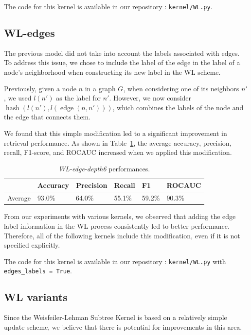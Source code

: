 \documentclass{IEEEtran}
\begin{document}
The code for this kernel is available in our repository : \texttt{kernel/WL.py}.

\subsection{WL-edges}
The previous model did not take into account the labels associated with edges. To address this issue, we chose to include the label of the edge in the label of a node's neighborhood when constructing its new label in the WL scheme.

Previously, given a node $n$ in a graph $G$, when considering one of its neighbors $n'$, we used $l(n')$ as the label for $n'$. However, we now consider $\operatorname*{hash}(l(n'), l(\operatorname{edge}(n, n')))$, which combines the labels of the node and the edge that connects them.

We found that this simple modification led to a significant improvement in retrieval performance.
As shown in Table~\ref{tab:wldepth6edge}, the average accuracy, precision, recall, F1-score, and ROCAUC increased when we applied this modification.


\begin{table}[h]
    \centering
    \begin{tabular}{l|llll|l}
                & Accuracy & Precision & Recall & F1     & ROCAUC \\
        \hline
        Average & 93.0\%   & 64.0\%    & 55.1\% & 59.2\% & 90.3\% \\
    \end{tabular}
    \caption{\emph{WL-edge-depth6} performances.}
    \label{tab:wldepth6edge}
\end{table}

From our experiments with various kernels, we observed that adding the edge label information in the WL process consistently led to better performance. Therefore, all of the following kernels include this modification, even if it is not specified explicitly.

The code for this kernel is available in our repository : \texttt{kernel/WL.py}
with \texttt{edges\_labels = True}.

\subsection{WL variants}
Since the Weisfeiler-Lehman Subtree Kernel is based on a relatively simple update scheme,
we believe that there is potential for improvements in this area.
\end{document}
